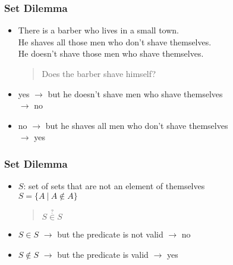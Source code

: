 \documentclass[dvipsnames]{beamer}
\begin{document}
\begin{frame}
  \frametitle{Set Dilemma}

  \begin{itemize}
    \item There is a barber who lives in a small town.\\
      He shaves all those men who don't shave themselves.\\
      He doesn't shave those men who shave themselves.

    \smallskip
    \begin{quote}
      Does the barber shave himself?
    \end{quote}

    \pause
    \item yes $\rightarrow$ but he doesn't shave men who shave themselves\\
      $\rightarrow$ no

    \pause
    \item no $\rightarrow$ but he shaves all men who don't shave themselves\\
      $\rightarrow$ yes
  \end{itemize}
\end{frame}

\begin{frame}
  \frametitle{Set Dilemma}

  \begin{itemize}
    \item $S$: set of sets that are not an element of themselves\\
      $S = \{A~|~A \notin A\}$

    \pause
    \smallskip
    \begin{quote}
      $S \stackrel{?}{\in} S$
    \end{quote}

    \pause
    \item $S \in S$ $\rightarrow$ but the predicate is not valid $\rightarrow$ no

    \pause
    \item $S \notin S$ $\rightarrow$ but the predicate is valid $\rightarrow$ yes
  \end{itemize}
\end{frame}

\end{document}
